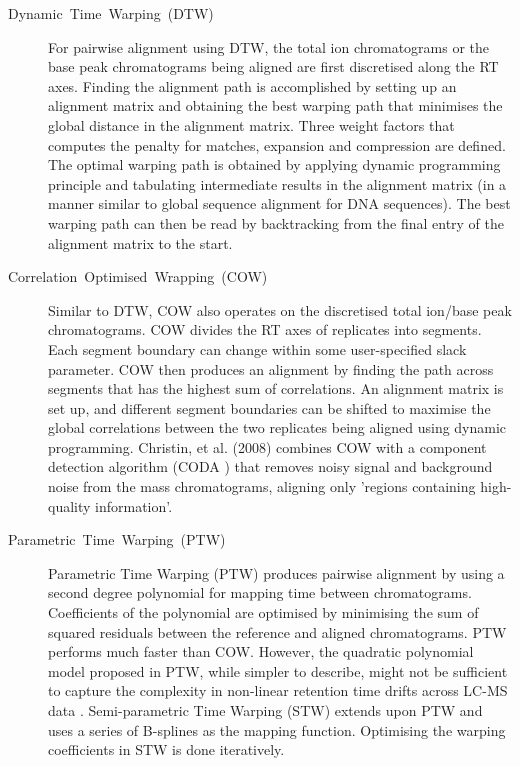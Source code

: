 \begin{description}

\item [{Dynamic~Time~Warping~(DTW)~\cite{Sakoe1978,Tomasi2004}}] For pairwise alignment using DTW, the total ion chromatograms or the base peak chromatograms being aligned are first discretised along the RT axes. Finding the alignment path is accomplished by setting up an alignment matrix and obtaining the best warping path that minimises the global distance in the alignment matrix. Three weight factors that computes the penalty for matches, expansion and compression are defined. The optimal warping path is obtained by applying dynamic programming principle and tabulating intermediate results in the alignment matrix (in a manner similar to global sequence alignment for DNA sequences). The best warping path can then be read by backtracking from the final entry of the alignment matrix to the start.

\item [{Correlation~Optimised~Wrapping~(COW)~\cite{Nielsen1998,Tomasi2004}}] Similar to DTW, COW also operates on the discretised total ion/base peak chromatograms. COW divides the RT axes of replicates into segments. Each segment boundary can change within some user-specified slack parameter. COW then produces an alignment by finding the path across segments that has the highest sum of correlations. An alignment matrix is set up, and different segment boundaries can be shifted to maximise the global correlations between the two replicates being aligned using dynamic programming. Christin, et al. (2008) \cite{Christin2008} combines COW with a component detection algorithm (CODA \cite{Windig1996,Windig2007}) that removes noisy signal and background noise from the mass chromatograms, aligning only 'regions containing high-quality information'.

\item [{Parametric~Time~Warping~(PTW)~\cite{VanNederkassel2006}}] Parametric Time Warping (PTW) produces pairwise alignment by using a second degree polynomial for mapping time between chromatograms. Coefficients of the polynomial are optimised by minimising the sum of squared residuals between the reference and aligned chromatograms. PTW performs much faster than COW. However, the quadratic polynomial model proposed in PTW, while simpler to describe, might not be sufficient to capture the complexity in non-linear retention time drifts across LC-MS data \cite{Podwojski2009}. Semi-parametric Time Warping (STW) extends upon PTW and uses a series of B-splines as the mapping function. Optimising the warping coefficients in STW is done iteratively.


\end{description}
